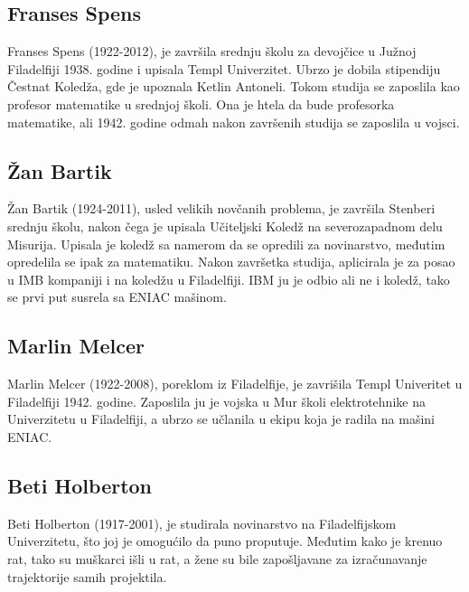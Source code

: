 \documentclass[a4paper,12pt]{article}
\begin{document}
\subsection{Franses Spens}
\begin{flushleft}

Franses Spens (1922-2012), je završila srednju školu za devojčice u Južnoj Filadelfiji 1938. godine i upisala Templ Univerzitet. Ubrzo je dobila stipendiju Čestnat Koledža, gde je upoznala Ketlin Antoneli. Tokom studija se zaposlila kao profesor matematike u srednjoj školi. Ona je htela da bude profesorka matematike, ali 1942. godine odmah nakon završenih studija se zaposlila u vojsci.

\end{flushleft}

\subsection{Žan Bartik}
\begin{flushleft}

Žan Bartik (1924-2011), usled velikih novčanih problema, je završila Stenberi srednju školu, nakon čega je upisala Učiteljski Koledž na severozapadnom delu Misurija. Upisala je koledž sa namerom da se opredili za novinarstvo, međutim opredelila se ipak za matematiku. Nakon završetka studija, aplicirala je za posao u IMB kompaniji i na koledžu u Filadelfiji. IBM ju je odbio ali ne i koledž, tako se prvi put susrela sa ENIAC mašinom. 

\end{flushleft}

\subsection{Marlin Melcer}
\begin{flushleft}

Marlin Melcer (1922-2008), poreklom iz Filadelfije, je zavrišila Templ Univeritet u Filadelfiji 1942. godine. Zaposlila ju je vojska u Mur školi elektrotehnike na Univerzitetu u Filadelfiji, a ubrzo se učlanila u ekipu koja je radila na mašini ENIAC. 

\end{flushleft}

\subsection{Beti Holberton}
\begin{flushleft}

Beti Holberton (1917-2001), je studirala novinarstvo na Filadelfijskom Univerzitetu, što joj je omogućilo da puno proputuje. Međutim kako je krenuo rat, tako su muškarci išli u rat, a žene su bile zapošljavane za izračunavanje trajektorije samih projektila.

\end{flushleft}
\end{document}
